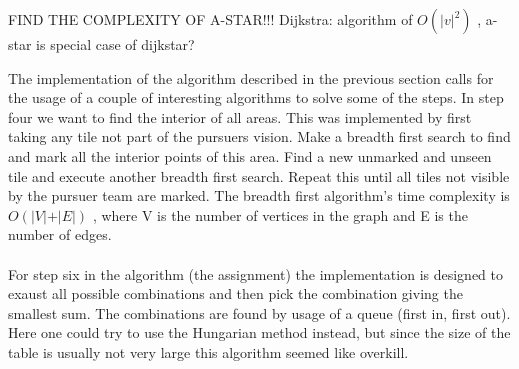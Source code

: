 FIND THE COMPLEXITY OF A-STAR!!! Dijkstra:  algorithm of $O(\vert v \vert^2)$ , a-star is special case of dijkstar? 


The implementation of the algorithm described in the previous section calls for the usage of a couple of interesting algorithms to solve some of the steps. In step four we want to find the interior of all areas. This was implemented by first taking any tile not part of the pursuers vision. Make a breadth first search to find and mark all the interior points of this area. Find a new unmarked and unseen tile and execute another breadth first search. Repeat this until all tiles not visible by the pursuer team are marked. The breadth first algorithm's time complexity is $O(\vert V \vert + \vert E \vert)$ \cite{adk8}, where V is the number of vertices in the graph and E is the number of edges.\\
\\For step six in the algorithm (the assignment) the implementation is designed to exaust all possible combinations and then pick the combination giving the smallest sum. The combinations are found by usage of a queue (first in, first out). Here one could try to use the Hungarian method \cite{hungarian} instead, but since the size of the table is usually not very large this algorithm seemed like overkill.  



